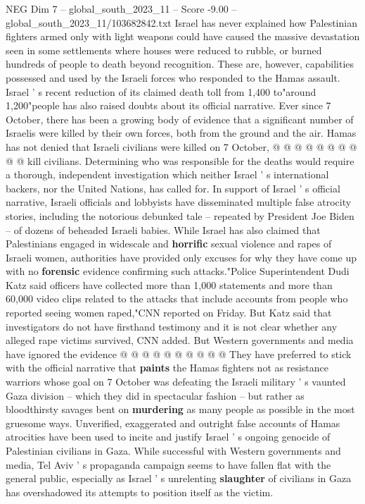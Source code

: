 \begin{textsample}{NEG Dim 7 – global\_south\_2023\_11 – Score -9.00 – global\_south\_2023\_11/103682842.txt}
Israel has never explained how Palestinian fighters armed only with light weapons could have caused the massive devastation seen in some settlements where houses were reduced to rubble, or burned hundreds of people to death beyond recognition.
These are, however, capabilities possessed and used by the Israeli forces who responded to the Hamas assault.
Israel ' s recent reduction of its claimed death toll from 1,400 to"around 1,200"people has also raised doubts about its official narrative.
Ever since 7 October, there has been a growing body of evidence that a significant number of Israelis were killed by their own forces, both from the ground and the air.
Hamas has not denied that Israeli civilians were killed on 7 October, @ @ @ @ @ @ @ @ @ @ kill civilians.
Determining who was responsible for the deaths would require a thorough, independent investigation which neither Israel ' s international backers, nor the United Nations, has called for.
In support of Israel ' s official narrative, Israeli officials and lobbyists have disseminated multiple false atrocity stories, including the notorious debunked tale -- repeated by President Joe Biden -- of dozens of beheaded Israeli babies.
While Israel has also claimed that Palestinians engaged in widescale and \textbf{horrific} sexual violence and rapes of Israeli women, authorities have provided only excuses for why they have come up with no \textbf{forensic} evidence confirming such attacks."Police Superintendent Dudi Katz said officers have collected more than 1,000 statements and more than 60,000 video clips related to the attacks that include accounts from people who reported seeing women raped,"CNN reported on Friday.
But Katz said that investigators do not have firsthand testimony and it is not clear whether any alleged rape victims survived, CNN added.
But Western governments and media have ignored the evidence @ @ @ @ @ @ @ @ @ @ They have preferred to stick with the official narrative that \textbf{paints} the Hamas fighters not as resistance warriors whose goal on 7 October was defeating the Israeli military ' s vaunted Gaza division -- which they did in spectacular fashion -- but rather as bloodthirsty savages bent on \textbf{murdering} as many people as possible in the most gruesome ways.
Unverified, exaggerated and outright false accounts of Hamas atrocities have been used to incite and justify Israel ' s ongoing genocide of Palestinian civilians in Gaza.
While successful with Western governments and media, Tel Aviv ' s propaganda campaign seems to have fallen flat with the general public, especially as Israel ' s unrelenting \textbf{slaughter} of civilians in Gaza has overshadowed its attempts to position itself as the victim.

\end{textsample}
